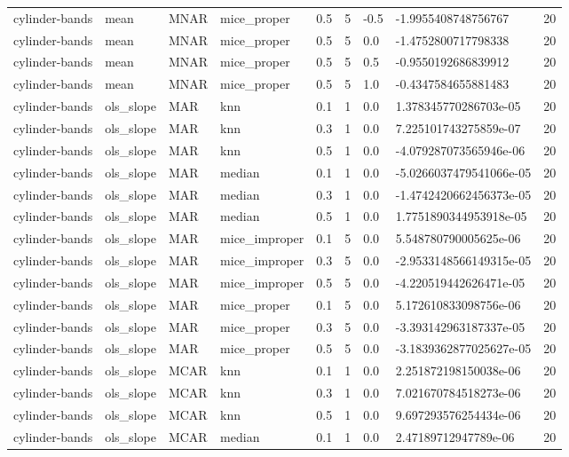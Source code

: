 \begin{tabular}{lllllllll}
cylinder-bands & mean & MNAR & mice\_proper & 0.5 & 5 & -0.5 & -1.9955408748756767 & 20 \\
cylinder-bands & mean & MNAR & mice\_proper & 0.5 & 5 & 0.0 & -1.4752800717798338 & 20 \\
cylinder-bands & mean & MNAR & mice\_proper & 0.5 & 5 & 0.5 & -0.9550192686839912 & 20 \\
cylinder-bands & mean & MNAR & mice\_proper & 0.5 & 5 & 1.0 & -0.4347584655881483 & 20 \\
cylinder-bands & ols\_slope & MAR & knn & 0.1 & 1 & 0.0 & 1.378345770286703e-05 & 20 \\
cylinder-bands & ols\_slope & MAR & knn & 0.3 & 1 & 0.0 & 7.225101743275859e-07 & 20 \\
cylinder-bands & ols\_slope & MAR & knn & 0.5 & 1 & 0.0 & -4.079287073565946e-06 & 20 \\
cylinder-bands & ols\_slope & MAR & median & 0.1 & 1 & 0.0 & -5.0266037479541066e-05 & 20 \\
cylinder-bands & ols\_slope & MAR & median & 0.3 & 1 & 0.0 & -1.4742420662456373e-05 & 20 \\
cylinder-bands & ols\_slope & MAR & median & 0.5 & 1 & 0.0 & 1.7751890344953918e-05 & 20 \\
cylinder-bands & ols\_slope & MAR & mice\_improper & 0.1 & 5 & 0.0 & 5.548780790005625e-06 & 20 \\
cylinder-bands & ols\_slope & MAR & mice\_improper & 0.3 & 5 & 0.0 & -2.9533148566149315e-05 & 20 \\
cylinder-bands & ols\_slope & MAR & mice\_improper & 0.5 & 5 & 0.0 & -4.220519442626471e-05 & 20 \\
cylinder-bands & ols\_slope & MAR & mice\_proper & 0.1 & 5 & 0.0 & 5.172610833098756e-06 & 20 \\
cylinder-bands & ols\_slope & MAR & mice\_proper & 0.3 & 5 & 0.0 & -3.393142963187337e-05 & 20 \\
cylinder-bands & ols\_slope & MAR & mice\_proper & 0.5 & 5 & 0.0 & -3.1839362877025627e-05 & 20 \\
cylinder-bands & ols\_slope & MCAR & knn & 0.1 & 1 & 0.0 & 2.251872198150038e-06 & 20 \\
cylinder-bands & ols\_slope & MCAR & knn & 0.3 & 1 & 0.0 & 7.021670784518273e-06 & 20 \\
cylinder-bands & ols\_slope & MCAR & knn & 0.5 & 1 & 0.0 & 9.697293576254434e-06 & 20 \\
cylinder-bands & ols\_slope & MCAR & median & 0.1 & 1 & 0.0 & 2.47189712947789e-06 & 20 \\

\end{tabular}
